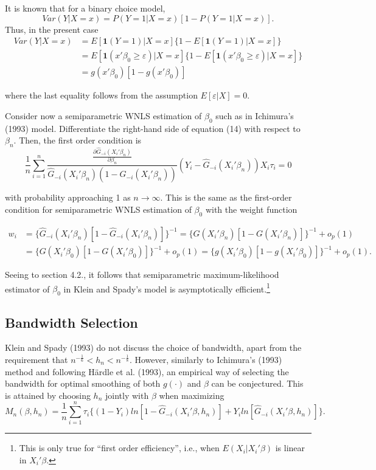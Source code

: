 \documentclass[a4paper]{article}
\begin{document}
It is known that for a binary choice model, 
\[Var(Y|X = x) = P(Y = 1|X = x)[1 - P(Y = 1|X = x)].\]
Thus, in the present case
\begin{align*}
Var(Y|X = x) & = E[\mathbf{1}{(Y = 1)}|X = x]\{1 - E[\mathbf{1}{(Y = 1)}|X = x]\} \\
&=E[\mathbf{1}{(x'\beta_0 \geq \varepsilon)}|X = x]\{1 - E[\mathbf{1}{(x'\beta_0 \geq \varepsilon)}|X = x]\} \\ 
& = g(x'\beta_0)[1 - g(x'\beta_0)]
\end{align*}

where the last equality follows from the assumption $E[\varepsilon|X]=0$.

Consider now a semiparametric WNLS estimation of $\beta_0$ such as in Ichimura's (1993) model. Differentiate the right-hand side of equation (14) with respect to $\beta_n$. Then, the first order condition is
\begin{equation}
\frac{1}{n} \sum_{i=1}^n \frac{\frac{\partial\hat{G}_{-i}(X_i'\beta_n)}{\partial \beta_n}}{\hat{G}_{-i}(X_i'\beta_n)(1 - \hat{G}_{-i}(X_i'\beta_n))} (Y_i - \hat{G}_{-i}(X_i'\beta_n)) X_i \tau_i = 0
\end{equation} 

with probability approaching 1 as $n \rightarrow \infty$. This is the same as the first-order condition for semiparametric WNLS estimation of $\beta_0$ with the weight function

\begin{align*}
w_i & = \{ \hat{G}_{-i}(X_i'\beta_n)[ 1 - \hat{G}_{-i}(X_i'\beta_n)]\}^{-1} = \{ G(X_i'\beta_n)[ 1 - G(X_i'\beta_n)]\}^{-1} + o_p(1) \\
     & = \{ G(X_i'\beta_0)[ 1 - G(X_i'\beta_0)]\}^{-1} + o_p(1) = \{ g(X_i'\beta_0)[ 1 - g(X_i'\beta_0)]\}^{-1} + o_p(1).
\end{align*}


Seeing to section 4.2., it follows that semiparametric maximum-likelihood estimator of $\beta_0$ in Klein and Spady's model is asymptotically efficient.\footnote{This is only true for ``first order efficiency'', i.e., when $E(X_i|X_i'\beta)$ is linear in $X_i'\beta$.}

\subsection{Bandwidth Selection} %
\label{sub:Bandwidth Selection}

Klein and Spady (1993) do not discuss the choice of bandwidth, apart from the requirement that $ n^{-\frac{1}{6}} < h_n < n^{-\frac{1}{8}}$. However, similarly to Ichimura's (1993) method and following H{\"a}rdle et al. (1993), an empirical way of selecting the bandwidth for optimal smoothing of both $g(\cdot)$ and $\beta$ can be conjectured. This is attained by choosing $h_n$ jointly with $\beta$ when maximizing
\begin{equation}
M_n(\beta, h_n) = \frac{1}{n}\sum_{i=1}^n \tau_{i}\{ (1 - Y_i)ln[ 1 - \hat{G}_{-i}(X_i'\beta, h_n)] +  Y_iln[\hat{G}_{-i}(X_i'\beta, h_n)]\}.
\end{equation}
\end{document}
